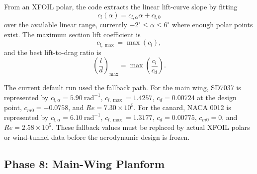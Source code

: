 From an XFOIL polar, the code extracts the linear lift-curve slope by fitting
\begin{equation}
    c_l(\alpha) = c_{l,\alpha}\alpha + c_{l,0}
    \label{eq:ppa_airfoil_fit}
\end{equation}
over the available linear range, currently \(-2^\circ \leq \alpha \leq 6^\circ\) where enough polar points exist. The maximum section lift coefficient is
\begin{equation}
    c_{l,\max} = \max(c_l),
    \label{eq:ppa_clmax_airfoil}
\end{equation}
and the best lift-to-drag ratio is
\begin{equation}
    \left(\frac{l}{d}\right)_{\max} = \max\left(\frac{c_l}{c_d}\right).
    \label{eq:ppa_airfoil_ld}
\end{equation}

The current default run used the fallback path. For the main wing, SD7037 is represented by \(c_{l,\alpha}=5.90~\mathrm{rad^{-1}}\), \(c_{l,\max}=1.4257\), \(c_d=0.00724\) at the design point, \(c_{m0}=-0.0758\), and \(Re=7.30\times10^5\). For the canard, NACA 0012 is represented by \(c_{l,\alpha}=6.10~\mathrm{rad^{-1}}\), \(c_{l,\max}=1.3177\), \(c_d=0.00775\), \(c_{m0}=0\), and \(Re=2.58\times10^5\). These fallback values must be replaced by actual XFOIL polars or wind-tunnel data before the aerodynamic design is frozen.

\subsection{Phase 8: Main-Wing Planform}
\label{subsec:ppa_phase8}


